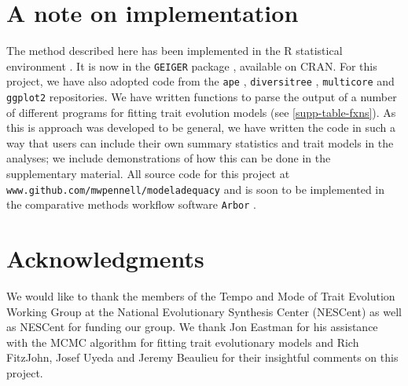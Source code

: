 \documentclass[12pt]{article}
\begin{document}
\section{A note on implementation}

The method described here has been implemented in the R statistical environment \citep{R}. It is now in the \texttt{GEIGER} package \citep{geiger}, available on CRAN. For this project, we have also adopted code from the \texttt{ape} \citep{ape}, \texttt{diversitree} \citep{FitzJohn2012}, \texttt{multicore} \citep{multicore} and \texttt{ggplot2} \citep{ggplot2} repositories. We have written functions to parse the output of a number of different programs for fitting trait evolution models (see \ref{supp-table-fxns}). As this is approach was developed to be general, we have written the code in such a way that users can include their own summary statistics and trait models in the analyses; we include demonstrations of how this can be done in the supplementary material. All source code for this project at \texttt{www.github.com/mwpennell/modeladequacy} and is soon to be implemented in the comparative methods workflow software \texttt{Arbor} \citep{HarmonArbor}. 

\section{Acknowledgments}

We would like to thank the members of the Tempo and Mode of Trait Evolution Working Group at the National Evolutionary Synthesis Center (NESCent) as well as NESCent for funding our group. We thank Jon Eastman for his assistance with the MCMC algorithm for fitting trait evolutionary models and Rich FitzJohn, Josef Uyeda and Jeremy Beaulieu for their insightful comments on this project.



\newpage


\end{document}
